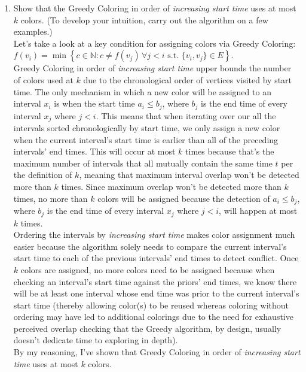 \documentclass[11pt]{article}
\begin{document}
\begin{enumerate}
\begin{enumerate}
        \item Show that the Greedy Coloring in order of \emph{increasing start time} uses at most \( k \) colors. (To develop your intuition, carry out the algorithm on a few examples.) \\

        Let's take a look at a key condition for assigning colors via Greedy Coloring: $f(v_i) = \min \left\{ c \in \mathbb{N} : c \neq f(v_j) \, \forall j < i \text{ s.t. } \{v_i, v_j\} \in E \right\}.$ \\
        
        Greedy Coloring in order of \textit{increasing start time} upper bounds the number of colors used at $k$ due to the chronological order of vertices visited by start time. The only mechanism in which a new color will be assigned to an interval $x_i$ is when the start time $a_i \leq b_{j}$, where $b_{j}$ is the end time of every interval $x_{j}$ where $j < i$. This means that when iterating over our all the intervals sorted chronologically by start time, we only assign a new color when the current interval's start time is earlier than all of the preceding intervals' end times. This will occur at most $k$ times because that's the maximum number of intervals that all mutually contain the same time $t$ per the definition of $k$, meaning that maximum interval overlap won't be detected more than $k$ times. Since maximum overlap won't be detected more than $k$ times, no more than $k$ colors will be assigned because the detection of $a_i \leq b_{j}$, where $b_{j}$ is the end time of every interval $x_{j}$ where $j < i$, will happen at most $k$ times.  \\

        Ordering the intervals by \textit{increasing start time} makes color assignment much easier because the algorithm solely needs to compare the current interval's start time to each of the previous intervals' end times to detect conflict. Once $k$ colors are assigned, no more colors need to be assigned because when checking an interval's start time against the priors' end times, we know there will be at least one interval whose end time was prior to the current interval's start time (thereby allowing color(s) to be reused whereas coloring without ordering may have led to additional colorings due to the need for exhaustive perceived overlap checking that the Greedy algorithm, by design, usually doesn't dedicate time to exploring in depth). \\

        By my reasoning, I've shown that Greedy Coloring in order of \emph{increasing start time} uses at most \( k \) colors. \\


\end{enumerate}
\end{enumerate}
\end{document}
